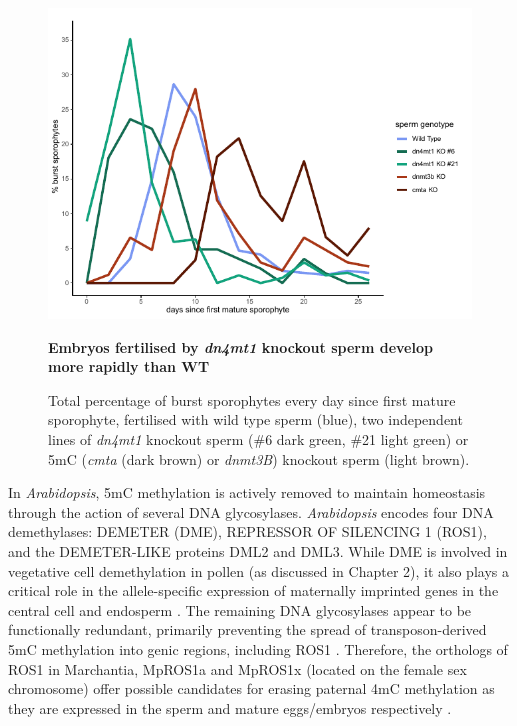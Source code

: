 \begin{figure}[htbp!] 
\centering    
    \includegraphics[width=1\textwidth]{Chapter3/Figs/Intro/burstpeak_nuclei_number.pdf}
\caption{\textbf{Embryos fertilised by \textit{dn4mt1} knockout sperm develop more rapidly than WT}}
\label{fig:burstpeak}
\captionsetup{font=small}
    \caption*{Total percentage of burst sporophytes every day since first mature sporophyte, fertilised with wild type sperm (blue), two independent lines of \textit{dn4mt1} knockout sperm (\#6 dark green, \#21 light green) or 5mC (\textit{cmta} (dark brown) or \textit{dnmt3B}) knockout sperm (light brown). }
\end{figure}

In \textit{Arabidopsis}, 5mC methylation is actively removed to maintain homeostasis through the action of several DNA glycosylases. \textit{Arabidopsis} encodes four DNA demethylases: DEMETER (DME), REPRESSOR OF SILENCING 1 (ROS1), and the DEMETER-LIKE proteins DML2 and DML3. While DME is involved in vegetative cell demethylation in pollen \citep{RN57} (as discussed in Chapter 2), it also plays a critical role in the allele-specific expression of maternally imprinted genes in the central cell and endosperm \citep{RN235}. The remaining DNA glycosylases appear to be functionally redundant, primarily preventing the spread of transposon-derived 5mC methylation into genic regions\citep{RN288}, including ROS1 \citep{RN168}. Therefore, the orthologs of ROS1 in Marchantia, MpROS1a and MpROS1x (located on the female sex chromosome) offer possible candidates for erasing paternal 4mC methylation as they are expressed in the sperm \citep{RN212} and mature eggs/embryos \citep{RN257} respectively \citep{RN169,RN257,RN189}.

